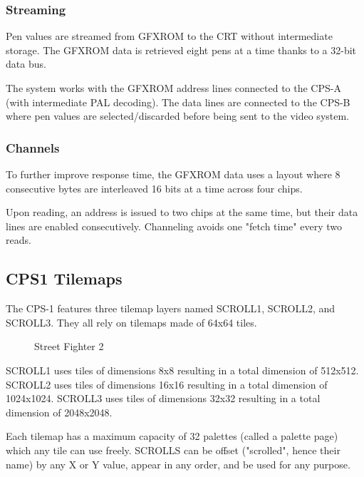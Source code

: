 \subsubsection{Streaming}
Pen values are streamed from GFXROM to the CRT without intermediate storage. The GFXROM data is retrieved eight pens at a time thanks to a 32-bit data bus.

The system works with the GFXROM address lines connected to the CPS-A (with intermediate PAL decoding). The data lines are connected to the CPS-B where pen values are selected/discarded before being sent to the video system.

 \begin{figure}[H]%
 \end{figure}%


\subsubsection{Channels}
To further improve response time, the GFXROM data uses a layout where 8 consecutive bytes are interleaved 16 bits at a time across four chips. 

Upon reading, an address is issued to two chips at the same time, but their data lines are enabled consecutively. Channeling avoids one "fetch time" every two reads.



\subsection{CPS1 Tilemaps}
The CPS-1 features three tilemap layers named SCROLL1, SCROLL2, and SCROLL3. They all rely on tilemaps made of 64x64 tiles.


\vfill
\begin{figure}[!b]
 \caption*{Street Fighter 2}%
 \end{figure}%
\pagebreak

SCROLL1 uses tiles of dimensions 8x8 resulting in a total dimension of 512x512. SCROLL2 uses tiles of dimensions 16x16 resulting in a total dimension of 1024x1024. SCROLL3 uses tiles of dimensions 32x32 resulting in a total dimension of 2048x2048.

Each tilemap has a maximum capacity of 32 palettes (called a palette page) which any tile can use freely. SCROLLS can be offset ("scrolled", hence their name) by any X or Y value, appear in any order, and be used for any purpose.


